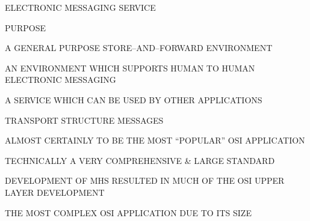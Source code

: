 

\begin{bwslide}

\begin{nrtc}
\item	ELECTRONIC MESSAGING SERVICE
\item	PURPOSE
	\begin{nrtc}
	\item	A GENERAL PURPOSE STORE--AND--FORWARD ENVIRONMENT
	\item	AN ENVIRONMENT WHICH SUPPORTS HUMAN TO HUMAN ELECTRONIC MESSAGING
	\item	A SERVICE WHICH CAN BE USED BY OTHER APPLICATIONS
	\item	TRANSPORT STRUCTURE MESSAGES
	\end{nrtc}
\end{nrtc}
\end{bwslide}


\begin{bwslide}

\begin{nrtc}
\item	ALMOST CERTAINLY TO BE THE MOST ``POPULAR'' OSI APPLICATION
\item	TECHNICALLY A VERY COMPREHENSIVE \& LARGE STANDARD
\item	DEVELOPMENT OF MHS RESULTED IN MUCH OF THE OSI UPPER LAYER DEVELOPMENT
\item	THE MOST COMPLEX OSI APPLICATION DUE TO ITS SIZE
\end{nrtc}
\end{bwslide}


%




